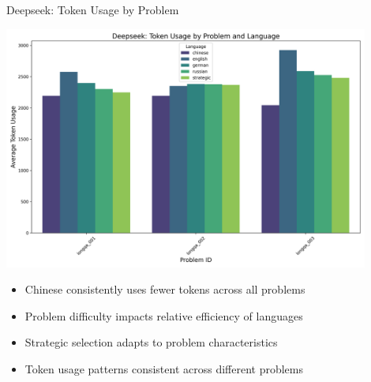 \documentclass{beamer}
\begin{document}
\begin{frame}{Deepseek: Token Usage by Problem}
    \begin{center}
        \includegraphics[width=0.9\textwidth]{visualizations/deepseek/deepseek_problem_tokens.png}
    \end{center}
    
    \begin{itemize}
        \item Chinese consistently uses fewer tokens across all problems
        \item Problem difficulty impacts relative efficiency of languages
        \item Strategic selection adapts to problem characteristics
        \item Token usage patterns consistent across different problems
    \end{itemize}
\end{frame}
\end{document}
